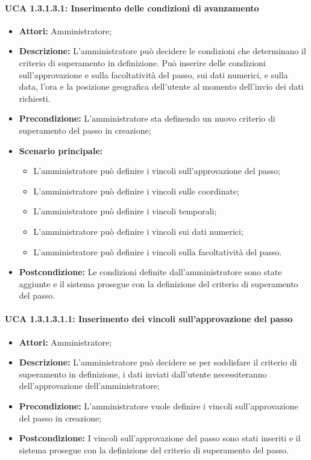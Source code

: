 \paragraph{UCA 1.3.1.3.1: Inserimento delle condizioni di avanzamento}
\begin{itemize}
\item \textbf{Attori:}
 Amministratore;
\item \textbf{Descrizione:} 
L'amministratore può decidere le condizioni che determinano il criterio di superamento in definizione.
Può inserire delle condizioni sull'approvazione e sulla facoltatività del passo, sui dati numerici, e sulla data, l'ora e la posizione geografica dell'utente al momento dell'invio dei dati richiesti.
\item \textbf{Precondizione:} 
L'amministratore sta definendo un nuovo criterio di superamento del passo in creazione;
\item \textbf{Scenario principale:} 
\begin{itemize}
\item L'amministratore può definire i vincoli sull'approvazione del passo;
\item L'amministratore può definire i vincoli sulle coordinate;
\item L'amministratore può definire i vincoli temporali;
\item L'amministratore può definire i vincoli sui dati numerici;
\item L'amministratore può definire i vincoli sulla facoltatività del passo.
\end{itemize}
\item \textbf{Postcondizione:}
 Le condizioni definite dall'amministratore sono state aggiunte e il sistema prosegue con la definizione del criterio di superamento del passo.
\end{itemize}

\paragraph{UCA 1.3.1.3.1.1: Inserimento dei vincoli sull'approvazione del passo}
\begin{itemize}
\item \textbf{Attori:}
 Amministratore;
\item \textbf{Descrizione:} 
L'amministratore può decidere se per soddisfare il criterio di superamento in definizione, i dati inviati dall'utente necessiteranno dell'approvazione dell'amministratore;
\item \textbf{Precondizione:} 
L'amministratore vuole definire i vincoli sull'approvazione del passo in creazione;
\item \textbf{Postcondizione:} 
I vincoli sull'approvazione del passo sono stati inseriti e il sistema prosegue con la definizione del criterio di superamento del passo.
\end{itemize}

